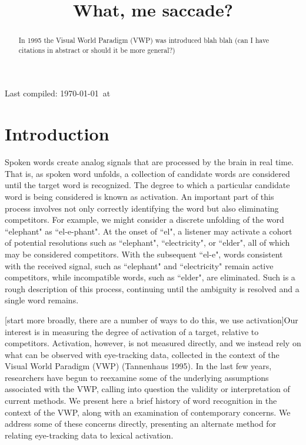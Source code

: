 \documentclass{article}
\title{What, me saccade?}
\date{}
\begin{document}

\maketitle

Last compiled: \today \  at \currenttime

%

\begin{abstract}
In 1995 the Visual World Paradigm (VWP) was introduced blah blah (can I have citations in abstract or should it be more general?)
\end{abstract}



\section{Introduction}

Spoken words create analog signals that are processed by the brain in real time. That is, as spoken word unfolds, a collection of candidate words are considered until the target word is recognized. The degree to which a particular candidate word is being considered is known as activation. An important part of this process involves not only correctly identifying the word but also eliminating competitors. For example, we might consider a discrete unfolding of the word ``elephant" as ``el-e-phant". At the onset of ``el", a listener may activate a cohort of potential resolutions such as ``elephant", ``electricity", or ``elder", all of which may be considered competitors. With the subsequent ``el-e", words consistent with the received signal, such as ``elephant" and ``electricity" remain active competitors, while incompatible words, such as ``elder", are eliminated. Such is a rough description of this process, continuing until the ambiguity is resolved and a single word remains.



[start more broadly, there are a number of ways to do this, we use activation]Our interest is in measuring the degree of activation of a target, relative to competitors. Activation, however, is not measured directly, and we instead rely on what can be observed with eye-tracking data, collected in the context of the Visual World Paradigm (VWP) (Tannenhaus 1995)\cite{tanenhaus1995integration}. In the last few years, researchers have begun to reexamine some of the underlying assumptions associated with the VWP, calling into question the validity or interpretation of current methods. We present here a brief history of word recognition in the context of the VWP, along with an examination of contemporary concerns. We address some of these concerns directly, presenting an alternate method for relating eye-tracking data to lexical activation.
\end{document}

